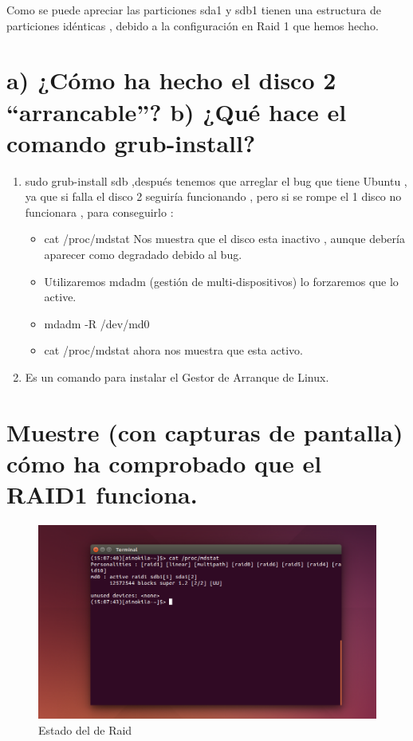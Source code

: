 	Como se puede apreciar las particiones sda1 y sdb1 tienen una estructura de particiones idénticas , debido a la configuración en Raid 1 que hemos hecho.



\section{a) ¿Cómo ha hecho el disco 2 “arrancable”? b) ¿Qué hace el comando grub-install?}

\begin{enumerate}[label=(\alph*)]
	\item sudo grub-install sdb ,después tenemos que arreglar el bug que tiene Ubuntu , ya que si falla el disco 2 seguiría funcionando , pero si se rompe el 1 disco no funcionara , para conseguirlo :
	\begin{itemize}
		\item cat /proc/mdstat Nos muestra que el disco esta inactivo , aunque debería aparecer como degradado debido al bug.
		\item Utilizaremos mdadm (gestión de multi-dispositivos) lo forzaremos que lo active.
		\item mdadm -R /dev/md0
		\item cat /proc/mdstat ahora nos muestra que esta activo.
	\end{itemize}
	\item Es un comando para instalar el Gestor de Arranque de Linux. \cite{grub}
\end{enumerate}


\section[Opcional 1]{Muestre (con capturas de pantalla) cómo ha comprobado que el RAID1 funciona.}

	\begin{figure}[H] %
			\centering
			\includegraphics[scale=0.5]{pics/Captura11.png}  %
			\caption{Estado del de Raid} \label{fig:figura11}
	\end{figure}

